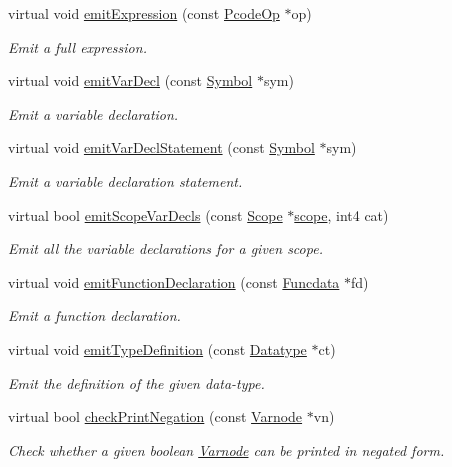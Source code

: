 \begin{DoxyCompactItemize}
virtual void \mbox{\hyperlink{class_print_c_a23d8dc013a41698d5168665451b356f6}{emit\+Expression}} (const \mbox{\hyperlink{class_pcode_op}{Pcode\+Op}} $\ast$op)
\begin{DoxyCompactList}\small\item\em Emit a full expression. \end{DoxyCompactList}\item 
virtual void \mbox{\hyperlink{class_print_c_ae05bed1958ac3b694bdeda2897e6a1ff}{emit\+Var\+Decl}} (const \mbox{\hyperlink{class_symbol}{Symbol}} $\ast$sym)
\begin{DoxyCompactList}\small\item\em Emit a variable declaration. \end{DoxyCompactList}\item 
virtual void \mbox{\hyperlink{class_print_c_a56fd9b353cd343909b2700fe42875885}{emit\+Var\+Decl\+Statement}} (const \mbox{\hyperlink{class_symbol}{Symbol}} $\ast$sym)
\begin{DoxyCompactList}\small\item\em Emit a variable declaration statement. \end{DoxyCompactList}\item 
virtual bool \mbox{\hyperlink{class_print_c_af3fcfeca02664799789cf4042956ee26}{emit\+Scope\+Var\+Decls}} (const \mbox{\hyperlink{class_scope}{Scope}} $\ast$\mbox{\hyperlink{class_print_c_ad83977328e9bfa4f33276563a4306d3e}{scope}}, int4 cat)
\begin{DoxyCompactList}\small\item\em Emit all the variable declarations for a given scope. \end{DoxyCompactList}\item 
virtual void \mbox{\hyperlink{class_print_c_a38f45bf42a0b28ed731eb036636d0a11}{emit\+Function\+Declaration}} (const \mbox{\hyperlink{class_funcdata}{Funcdata}} $\ast$fd)
\begin{DoxyCompactList}\small\item\em Emit a function declaration. \end{DoxyCompactList}\item 
virtual void \mbox{\hyperlink{class_print_c_a36b4db5295cfb6eb9a9d93b36b2a5cc8}{emit\+Type\+Definition}} (const \mbox{\hyperlink{class_datatype}{Datatype}} $\ast$ct)
\begin{DoxyCompactList}\small\item\em Emit the definition of the given data-\/type. \end{DoxyCompactList}\item 
virtual bool \mbox{\hyperlink{class_print_c_ad1f1099f49b4169948682a34c5b9f9cb}{check\+Print\+Negation}} (const \mbox{\hyperlink{class_varnode}{Varnode}} $\ast$vn)
\begin{DoxyCompactList}\small\item\em Check whether a given boolean \mbox{\hyperlink{class_varnode}{Varnode}} can be printed in negated form. \end{DoxyCompactList}\end{DoxyCompactItemize}
